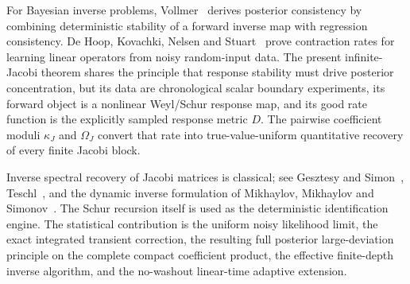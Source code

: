 For Bayesian inverse problems, Vollmer~\cite{Vollmer2013} derives posterior
consistency by combining deterministic stability of a forward inverse map
with regression consistency.  De Hoop, Kovachki, Nelsen and
Stuart~\cite{deHoopEtAl2023} prove contraction rates for learning linear
operators from noisy random-input data.  The present infinite-Jacobi theorem
shares the principle that response stability must drive posterior
concentration, but its data are chronological scalar boundary experiments,
its forward object is a nonlinear Weyl/Schur response map, and its good rate
function is the explicitly sampled response metric \(D\).  The pairwise
coefficient moduli \(\kappa_J\) and \(\Omega_J\) convert that rate into
true-value-uniform quantitative recovery of every finite Jacobi block.

Inverse spectral recovery of Jacobi matrices is classical; see Gesztesy and
Simon~\cite{GesztesySimon1997}, Teschl~\cite{Teschl2000}, and the dynamic
inverse formulation of Mikhaylov, Mikhaylov and
Simonov~\cite{Mikhaylov2019}.  The Schur recursion itself is used as the
deterministic identification engine.  The statistical contribution is the
uniform noisy likelihood limit, the exact integrated transient correction,
the resulting full posterior large-deviation principle on the complete
compact coefficient product, the effective finite-depth inverse algorithm,
and the no-washout linear-time adaptive extension.
